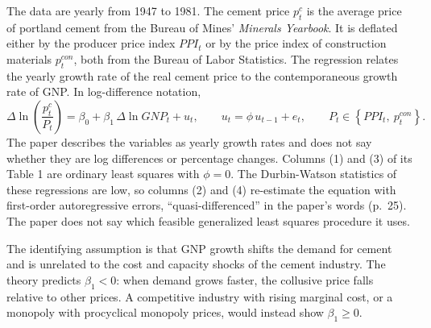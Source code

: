 The data are yearly from 1947 to 1981. The cement price $p^c_t$ is the average price of portland cement from the
Bureau of Mines' \textit{Minerals Yearbook}. It is deflated either by the producer price index $\mathit{PPI}_t$ or by the
price index of construction materials $p^{\mathit{con}}_t$, both from the Bureau of Labor Statistics. The regression
relates the yearly growth rate of the real cement price to the contemporaneous growth rate of GNP. In log-difference
notation,
\begin{equation}\label{eq:12-rs-cement}
\Delta \ln\left(\frac{p^c_t}{P_t}\right) = \beta_0 + \beta_1\, \Delta\ln \mathit{GNP}_t + u_t, \qquad u_t = \phi\, u_{t-1} + e_t,
\qquad P_t \in \left\{\mathit{PPI}_t,\ p^{\mathit{con}}_t\right\}.
\end{equation}
The paper describes the variables as yearly growth rates and does not say whether they are log differences or
percentage changes. Columns (1) and (3) of its Table 1 are ordinary least squares with $\phi = 0$. The Durbin-Watson
statistics of these regressions are low, so columns (2) and (4) re-estimate the equation with first-order
autoregressive errors, ``quasi-differenced'' in the paper's words (p.~25). The paper does not say which feasible
generalized least squares procedure it uses.

The identifying assumption is that GNP growth shifts the demand for cement and is unrelated to the cost and capacity
shocks of the cement industry. The theory predicts $\beta_1 < 0$: when demand grows faster, the collusive price falls
relative to other prices. A competitive industry with rising marginal cost, or a monopoly with procyclical monopoly
prices, would instead show $\beta_1 \ge 0$.

